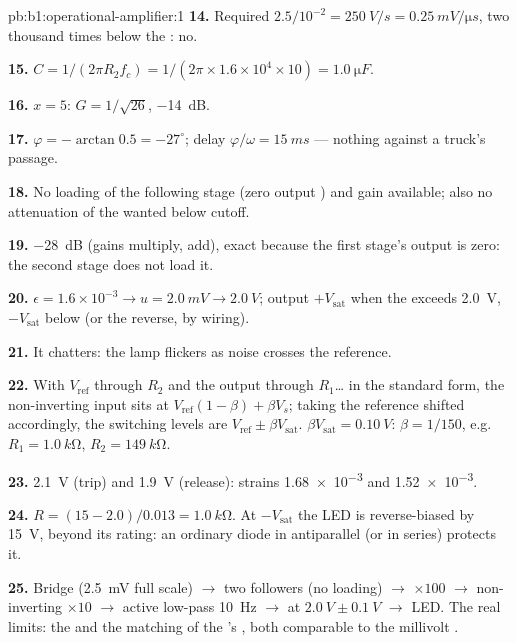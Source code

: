 \begin{solution}{pb:b1:operational-amplifier:1}
\textbf{14.} Required $2.5/10^{-2} = \qty{250}{V/s} = \qty{0.25}{mV/\micro s}$,
two thousand times below the : no.

\textbf{15.} $C = 1/(2\pi R_2f_c) = 1/(2\pi \times 1.6\times10^4 \times 10)
= \qty{1.0}{\micro F}$.

\textbf{16.} $x = 5$: $G = 1/\sqrt{26}$, \qty{-14}{dB}.

\textbf{17.} $\varphi = -\arctan 0.5 = -27^\circ$; delay $\varphi/\omega =
\qty{15}{ms}$ --- nothing against a truck's passage.

\textbf{18.} No loading of the following stage (zero output )
and gain available; also no attenuation of the wanted  below
cutoff.

\textbf{19.} \qty{-28}{dB} (gains multiply,  add), exact because
the first stage's output  is zero: the second stage does not
load it.

\textbf{20.} $\epsilon = 1.6\times10^{-3} \to u = \qty{2.0}{mV} \to
\qty{2.0}{V}$; output $+V_{\mathrm{sat}}$ when the  exceeds
\qty{2.0}{V}, $-V_{\mathrm{sat}}$ below (or the reverse, by wiring).

\textbf{21.} It chatters: the lamp flickers as noise crosses the
reference.

\textbf{22.} With $V_{\mathrm{ref}}$ through $R_2$ and the output through
$R_1$\dots{} in the standard form, the non-inverting input sits at
$V_{\mathrm{ref}}(1 - \beta) + \beta V_s$; taking the reference shifted
accordingly, the switching levels are $V_{\mathrm{ref}} \pm \beta V_{\mathrm{sat}}$.
$\beta V_{\mathrm{sat}} = \qty{0.10}{V}$: $\beta = 1/150$, e.g.\ $R_1 =
\qty{1.0}{k\ohm}$, $R_2 = \qty{149}{k\ohm}$.

\textbf{23.} \qty{2.1}{V} (trip) and \qty{1.9}{V} (release): strains
\num{1.68e-3} and \num{1.52e-3}.

\textbf{24.} $R = (15 - 2.0)/0.013 = \qty{1.0}{k\ohm}$. At
$-V_{\mathrm{sat}}$ the LED is reverse-biased by \qty{15}{V}, beyond its
rating: an ordinary diode in antiparallel (or in series) protects it.

\textbf{25.} Bridge (\qty{2.5}{mV} full scale) $\to$ two followers (no
loading) $\to$  $\times100$ $\to$ non-inverting
$\times10$ $\to$ active low-pass \qty{10}{Hz} $\to$  at
$\qty{2.0}{V} \pm \qty{0.1}{V}$ $\to$ LED. The real limits: the  and the matching of the 's
, both comparable to the millivolt .
\end{solution}
